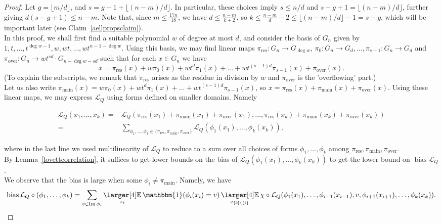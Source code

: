 \documentclass[a4paper,11pt]{article}
\theoremstyle{definition}
\newcommand\id{\mathbbm{1}}
\newcommand{\on}[1]{
	\operatorname{#1}
}
\newcommand{\exx}{
  \mathop{
    \mathchoice{\vcenter{\hbox{\larger[4]$\mathbb{E}$}}}
               {\kern0pt\mathbb{E}}
               {\kern0pt\mathbb{E}}
               {\kern0pt\mathbb{E}}
  }\displaylimits
}
\begin{document}
\begin{proof}
    Let $g = \lfloor m/d\rfloor$, and $s = g -1 + \lfloor (n-m)/d\rfloor$. In particular, these choices imply $s \leq n/d$ and $s - g + 1 = \lfloor (n-m)/d\rfloor$, further giving $d(s - g + 1) \leq n - m$. Note that, since $m \leq \frac{17n}{18}$, we have $d \leq \frac{n - m}{k + 2}$, so $k \leq \frac{n-m}{d} - 2 \leq \lfloor (n-m)/d\rfloor - 1 = s - g$, which will be important later (see Claim~\ref{aellpropsclaim}).\\
    
    In this proof, we shall first find a suitable polynomial $w$ of degree at most $d$, and consider the basis of $G_n$ given by $1, t, \dots, t^{\deg w - 1}, w, wt, \dots, wt^{n - 1- \deg w}$. Using this basis, we may find linear maps $\pi_{\on{res}} : G_n \to G_{\deg w}$, $\pi_0 : G_n \to G_d, \dots, \pi_{s - 1} : G_n \to G_d$ and $\pi_{\on{over}} : G_n \to w t^{sd} \cdot G_{n - \deg w - sd}$ such that for each $x \in G_n$ we have
    \[x = \pi_{\on{res}}(x) + w \pi_0(x) + wt^d \pi_1(x) + \dots + wt^{(s-1)d} \pi_{s-1}(x) + \pi_{\on{over}}(x).\]
    (To explain the subscripts, we remark that $\pi_{\on{res}}$ arises as the residue in division by $w$ and $\pi_{\on{over}}$ is the 'overflowing' part.)\\
    
    Let us also write $\pi_{\on{main}}(x) = w \pi_0(x) + wt^d \pi_1(x) + \dots + wt^{(s-1)d} \pi_{s-1}(x)$, so $x = \pi_{\on{res}}(x) + \pi_{\on{main}}(x) + \pi_{\on{over}}(x)$. Using these linear maps, we may express $\mathcal{L}_Q$ using forms defined on smaller domains. Namely

    \begin{align*}\mathcal{L}_Q(x_1, \dots, x_k) = & \mathcal{L}_Q(\pi_{\on{res}}(x_1) + \pi_{\on{main}}(x_1) + \pi_{\on{over}}(x_1), \dots, \pi_{\on{res}}(x_k) + \pi_{\on{main}}(x_k) + \pi_{\on{over}}(x_k)) \\
    = &\sum_{\phi_1, \dots, \phi_k \in \{\pi_{\on{res}}, \pi_{\on{main}}, \pi_{\on{over}}\}} \mathcal{L}_Q(\phi_1(x_1), \dots, \phi_k(x_k)),\end{align*}

    where in the last line we used multilinearity of $\mathcal{L}_Q$ to reduce to a sum over all choices of forms $\phi_1, \dots, \phi_k$ among $\pi_{\on{res}}, \pi_{\on{main}}, \pi_{\on{over}}$.\\

    By Lemma~\ref{lovettcorrelation}, it suffices to get lower bounds on the bias of $\mathcal{L}_Q(\phi_1(x_1), \dots, \phi_k(x_k))$ to get the lower bound on $\on{bias} \mathcal{L}_Q$.\\
    \indent We observe that the bias is large when some $\phi_i \not= \pi_{\on{main}}$. Namely, we have
    \[\on{bias}\mathcal{L}_Q \circ (\phi_1, \dots, \phi_k) = \sum_{v \in \on{Im} \phi_i} \exx_{x_i} \id(\phi_i(x_i) = v) \exx_{x_{[k] \setminus \{i\}}} \chi \circ \mathcal{L}_Q(\phi_1(x_1), \dots, \phi_{i-1}(x_{i-1}), v, \phi_{i+1}(x_{i+1}), \dots, \phi_{k}(x_{k})).\]


\end{proof}
\end{document}
